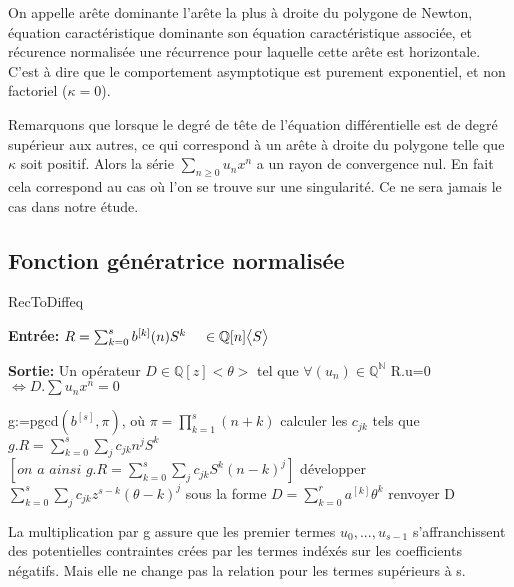 \documentclass[a4paper,10.5pt]{article}
\begin{document}
	\begin{definition} On appelle arête dominante l'arête la plus à droite du polygone de Newton, équation caractéristique dominante son équation caractéristique associée, et récurence normalisée une récurrence pour laquelle cette arête est horizontale. C'est à dire que le comportement asymptotique est purement exponentiel, et non factoriel ($\kappa=0$).
	\end{definition}
	\vspace{7mm}
	Remarquons que lorsque le degré de tête de l'équation différentielle est de degré supérieur aux autres, ce qui correspond à un arête à droite du polygone telle que $\kappa$ soit positif. Alors la série $\sum_{n\geq 0}u_nx^n$ a un rayon de convergence nul. En fait cela correspond au cas où l'on se trouve sur une singularité. Ce ne sera jamais le cas dans notre étude.
	
	\subsection{Fonction génératrice normalisée}
	
	\begin{algorithm}
		\caption{RecToDiffeq}
		
		\vspace{2mm}
		
		\textbf{Entrée:} $R=\sum_{k=0}^{s} b^{[k]}(n)S^{k} \hspace{4mm} \in \mathbb{Q}[n]\big<S\big>$
		
		\textbf{Sortie:} Un opérateur $D \in \mathbb{Q}[z] \big<\theta\big>$ tel que $\forall (u_{n}) \in \mathbb{Q}^{\mathbb{N}}$ R.u=0 $\iff D.\sum u_{n}x^{n}=0$ 
		
		\begin{algorithmic}[1]
			\vspace{3mm}
			\STATE g:=pgcd$(b^{[s]},\pi)$, où $\pi=\prod_{k=1}^{s}(n+k)$
			\vspace{3mm}
			\STATE calculer les $c_{jk}$ tels que $g.R=\sum_{k=0}^{s}\sum_{j}c_{jk}n^{j}S^{k}$\\
			\vspace{3mm}
			$[\textit{on a ainsi } g.R=\sum_{k=0}^{s}\sum_{j}c_{jk}S^{k}(n-k)^{j}]$
			\vspace{3mm}
			\STATE développer $\sum_{k=0}^{s}\sum_{j} c_{jk}z^{s-k}(\theta-k)^{j}$ sous la forme $D=\sum_{k=0}^{r} a^{[k]}\theta^{k}$
			\vspace{3mm}
			\STATE renvoyer D
		\end{algorithmic}
	\end{algorithm}
	\noindent La multiplication par g assure que les premier termes $u_{0},...,u_{s-1}$
	s'affranchissent des potentielles contraintes crées par les termes indéxés sur les coefficients négatifs. Mais elle ne change pas la relation pour les termes supérieurs à s.
	
\end{document}
